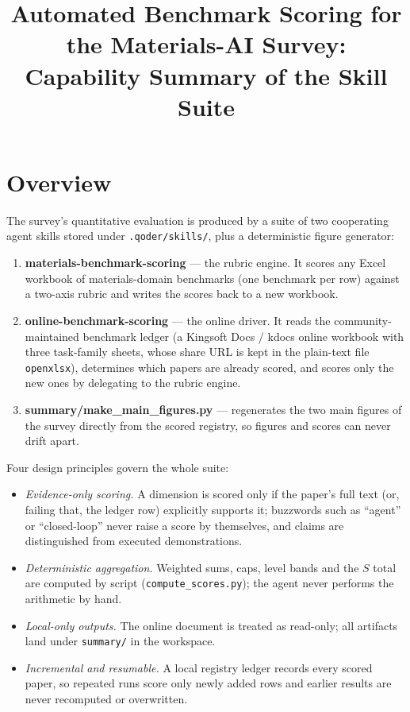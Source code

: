 \documentclass[11pt,a4paper]{article}
\title{%
  \textbf{\large Automated Benchmark Scoring for the Materials-AI Survey:\\
  Capability Summary of the Skill Suite}%
}
\author{}
\date{}
\begin{document}
\maketitle
\thispagestyle{empty}

\section{Overview}
The survey's quantitative evaluation is produced by a suite of two
cooperating agent skills stored under \texttt{.qoder/skills/}, plus a
deterministic figure generator:

\begin{enumerate}[leftmargin=1.6em,itemsep=2pt,topsep=2pt]
  \item \textbf{materials-benchmark-scoring} --- the rubric engine. It scores
    any Excel workbook of materials-domain benchmarks (one benchmark per row)
    against a two-axis rubric and writes the scores back to a new workbook.
  \item \textbf{online-benchmark-scoring} --- the online driver. It reads the
    community-maintained benchmark ledger (a Kingsoft Docs / kdocs online
    workbook with three task-family sheets, whose share URL is kept in the
    plain-text file \texttt{openxlsx}), determines which papers are already
    scored, and scores only the new ones by delegating to the rubric engine.
  \item \textbf{summary/make\_main\_figures.py} --- regenerates the two main
    figures of the survey directly from the scored registry, so figures and
    scores can never drift apart.
\end{enumerate}

Four design principles govern the whole suite:
\begin{itemize}[leftmargin=1.6em,itemsep=1pt,topsep=2pt]
  \item \emph{Evidence-only scoring.} A dimension is scored only if the paper's
    full text (or, failing that, the ledger row) explicitly supports it;
    buzzwords such as ``agent'' or ``closed-loop'' never raise a score by
    themselves, and claims are distinguished from executed demonstrations.
  \item \emph{Deterministic aggregation.} Weighted sums, caps, level bands and
    the $S$ total are computed by script (\texttt{compute\_scores.py}); the
    agent never performs the arithmetic by hand.
  \item \emph{Local-only outputs.} The online document is treated as read-only;
    all artifacts land under \texttt{summary/} in the workspace.
  \item \emph{Incremental and resumable.} A local registry ledger records every
    scored paper, so repeated runs score only newly added rows and earlier
    results are never recomputed or overwritten.
\end{itemize}
\end{document}
